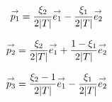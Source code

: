       \begin{minipage}{\textwidth}
        \begin{minipage}{0.329\textwidth}
            \begin{center}
              \begin{tikzpicture}[scale=1]
                
              \end{tikzpicture}
            \end{center}
            \begin{equation*}
              \vect{p_1}=\frac{\xi_2}{2|T|}\vect{e_1}-\frac{\xi_1}{2|T|}\vect{e_2}
            \end{equation*}
        \end{minipage}
        \begin{minipage}{0.329\textwidth}
            \begin{center}
              \begin{tikzpicture}[scale=1]
                
              \end{tikzpicture}
               \begin{equation*}
                \vect{p_2}= \frac{\xi_2}{2|T|}\vect{e_1} + \frac{1-\xi_1}{2|T|}\vect{e_2}
              \end{equation*}
            \end{center}
        \end{minipage}
        \begin{minipage}{0.329\textwidth}
            \begin{center}
              \begin{tikzpicture}[scale=1]
                
              \end{tikzpicture}
              \begin{equation*}
                \vect{p_3}= \frac{\xi_2-1}{2|T|}\vect{e_1} - \frac{\xi_1}{2|T|}\vect{e_2}
              \end{equation*}
            \end{center}
        \end{minipage}
        \label{fig:form_int:fon_base:p}
      \end{minipage}


